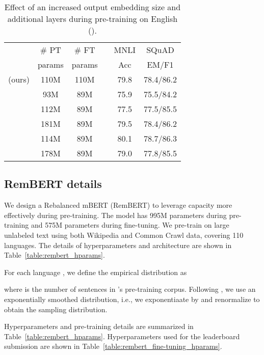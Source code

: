 \documentclass{article} \usepackage{iclr2021_conference,times}
\begin{document}
\begin{table*}[t]
\caption{Effect of an increased output embedding size  and additional layers during pre-training  on English  ().}
\label{table:monolingual_results}
\begin{center}
\begin{tabular}{lccccc}
\toprule
 & \# PT & \# FT & & MNLI & SQuAD \\
 & params & params & & Acc & EM/F1 \\ \midrule
 (ours) & 110M & 110M & & 79.8 & 78.4/86.2\\ \midrule
 & 93M & 89M & & 75.9 & 75.5/84.2 \\ 
 & 112M & 89M & & 77.5 & 77.5/85.5 \\
 & 181M & 89M & & 79.5 & 78.4/86.2 \\
 & 114M & 89M & & 80.1 & 78.7/86.3 \\
 & 178M & 89M & & 79.0 & 77.8/85.5 \\
\bottomrule
\end{tabular}
\end{center}
\end{table*}

\subsection{RemBERT details} \label{app:rembert}

We design a Rebalanced mBERT (RemBERT) to leverage capacity more effectively during pre-training. The model has 995M parameters during pre-training and 575M parameters during fine-tuning. We pre-train on large unlabeled text using both Wikipedia and Common Crawl data, covering 110 languages. The details of hyperparameters and architecture are shown in Table~\ref{table:rembert_hparams}.

For each language , we define the empirical distribution as

where  is the number of sentences in 's pre-training corpus. Following \citet{Devlin2019}, we use an exponentially smoothed distribution, i.e., we exponentiaate  by  and renormalize to obtain the sampling distribution.

Hyperparameters and pre-training details are summarized in Table~\ref{table:rembert_hparams}. Hyperparameters used for the leaderboard submission are shown in Table~\ref{table:rembert_fine-tuning_hparams}.
\end{document}
